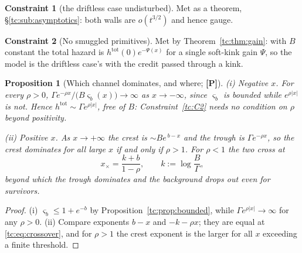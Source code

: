 \documentclass[11pt]{article}
\numberwithin{equation}{section}
\theoremstyle{plain}
\newtheorem{proposition}[theorem]{Proposition}
\theoremstyle{definition}
\newtheorem{constraint}{Constraint}
\theoremstyle{remark}
\begin{document}
\begin{constraint}[the driftless case undisturbed]\label{tc:C3}
Met as a theorem, \S\ref{tc:sub:asymptotics}: both walls are
$o(t^{3/2})$ and hence gauge.
\end{constraint}

\begin{constraint}[No smuggled primitives]\label{tc:C4}
Met by Theorem~\ref{tc:thm:gain}: with $B$ constant the total hazard is
$h^{\mathrm{tot}}(0)e^{-\Psi(x)}$ for a single soft-kink gain $\Psi$, so
the model is the driftless case's with the credit passed through a kink.
\end{constraint}

\begin{proposition}[Which channel dominates, and where; \textbf{[P]}]
\label{tc:prop:dropout}
\emph{(i) Negative $x$.} For every $\rho>0$,
$\Gamma e^{-\rho x}/\bigl(B\varsigma_b(x)\bigr)\to\infty$ as
$x\to-\infty$, since $\varsigma_b$ is bounded while $e^{\rho|x|}$ is
not. Hence $h^{\mathrm{tot}}\sim\Gamma e^{\rho|x|}$, free of $B$:
Constraint~\ref{tc:C2} needs no condition on $\rho$ beyond positivity.

\emph{(ii) Positive $x$.} As $x\to+\infty$ the crest is
$\sim Be^{\,b-x}$ and the trough is $\Gamma e^{-\rho x}$, so the crest
dominates for all large $x$ if and only if $\rho>1$. For $\rho<1$ the
two cross at
\begin{equation}\label{tc:eq:crossover}
x_{\times}=\frac{k+b}{1-\rho},\qquad k:=\log\frac{B}{\Gamma},
\end{equation}
beyond which the trough dominates and the background drops out
\emph{even for survivors}.
\end{proposition}

\begin{proof}
(i) $\varsigma_b\le1+e^{-b}$ by Proposition~\ref{tc:prop:bounded}, while
$\Gamma e^{\rho|x|}\to\infty$ for any $\rho>0$. (ii) Compare exponents
$b-x$ and $-k-\rho x$; they are equal at \eqref{tc:eq:crossover}, and
for $\rho>1$ the crest exponent is the larger for all $x$ exceeding a
finite threshold.
\end{proof}
\end{document}
